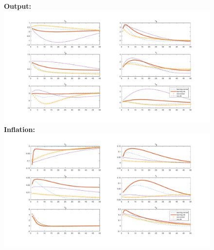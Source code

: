 \documentclass[12pt,reqno]{article}
\numberwithin{equation}{section}
\begin{document}
\begin{figure}[H]
\label{irf_msv_2}
\textbf{Output:}\\
\includegraphics[scale=0.5]{MSV_impresp_output_riseComp.pdf}
\textbf{Inflation:}\\
\includegraphics[scale=0.5]{MSV_impresp_pinf_riseComp.pdf}

\end{figure}

\end{document}
